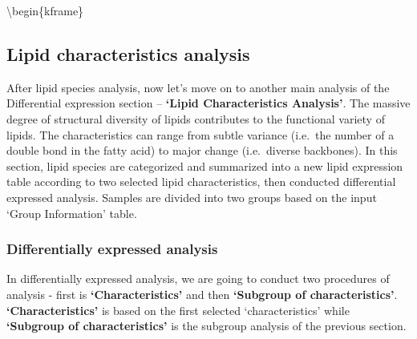 \documentclass[]{article}
\begin{document}
\textbackslash begin\{kframe\}

\hypertarget{lipid-characteristics-analysis}{%
\subsection{Lipid characteristics analysis}\label{lipid-characteristics-analysis}}

After lipid species analysis, now let's move on to another main analysis of the Differential expression section -- \textbf{`Lipid Characteristics Analysis'}. The massive degree of structural diversity of lipids contributes to the functional variety of lipids. The characteristics can range from subtle variance (i.e.~the number of a double bond in the fatty acid) to major change (i.e.~diverse backbones). In this section, lipid species are categorized and summarized into a new lipid expression table according to two selected lipid characteristics, then conducted differential expressed analysis. Samples are divided into two groups based on the input `Group Information' table.

\hypertarget{sec:DE-char}{%
\subsubsection{Differentially expressed analysis}\label{sec:DE-char}}

In differentially expressed analysis, we are going to conduct two procedures of analysis - first is \textbf{`Characteristics'} and then \textbf{`Subgroup of characteristics'}. \textbf{`Characteristics'} is based on the first selected `characteristics' while \textbf{`Subgroup of characteristics'} is the subgroup analysis of the previous section.
\end{document}
